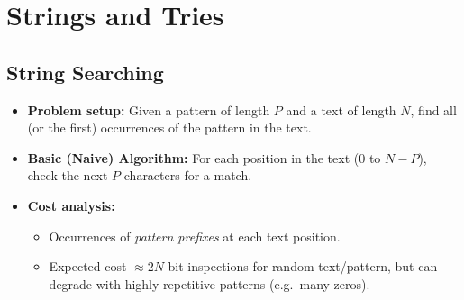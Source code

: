 \documentclass[11pt,letterpaper]{article}
\begin{document}
\section{Strings and Tries}

\subsection{String Searching}
\begin{itemize}
  \item \textbf{Problem setup:} Given a pattern of length $P$ and a text of length $N$, find all (or the first) occurrences of the pattern in the text.
  \item \textbf{Basic (Naive) Algorithm:} For each position in the text (0 to $N-P$), check the next $P$ characters for a match.
  \item \textbf{Cost analysis:} 
    \begin{itemize}
      \item Occurrences of \emph{pattern prefixes} at each text position.
      \item Expected cost $\approx 2N$ bit inspections for random text/pattern, but can degrade with highly repetitive patterns (e.g.\ many zeros).
    \end{itemize}
\end{itemize}

\end{document}
